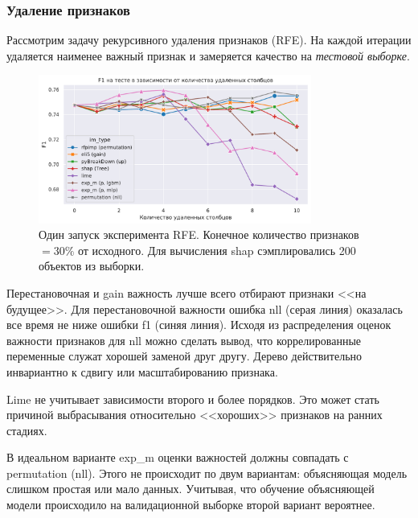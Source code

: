 \documentclass[12pt]{article}
\begin{document}
\subsubsection{Удаление признаков}
Рассмотрим задачу рекурсивного удаления признаков (RFE). На каждой итерации удаляется наименее важный признак и замеряется качество на \emph{тестовой выборке}.
\begin{figure}[h]
\centering
\includegraphics[width=0.8\textwidth]{images/RFE_f1.pdf}
\caption{\centering Один запуск эксперимента RFE. Конечное количество признаков $= 30\%$ от исходного. Для вычисления shap сэмплировались 200 объектов из выборки.}
\end{figure}

Перестановочная и gain важность лучше всего отбирают признаки <<на будущее>>. Для перестановочной важности ошибка nll (серая линия) оказалась все время не ниже ошибки f1 (синяя линия). Исходя из распределения оценок важности признаков для nll можно сделать вывод, что коррелированные переменные служат хорошей заменой друг другу. Дерево действительно инвариантно к сдвигу или масштабированию признака. 

Lime не учитывает зависимости второго и более порядков. Это может стать причиной выбрасывания относительно <<хороших>> признаков на ранних стадиях.

В идеальном варианте exp\_m оценки важностей должны совпадать с permutation (nll). Этого не происходит по двум вариантам: объясняющая модель слишком простая или мало данных. Учитывая, что обучение объясняющей модели происходило на валидационной выборке второй вариант вероятнее. 


\label{added_art}

\newpage
\end{document}
